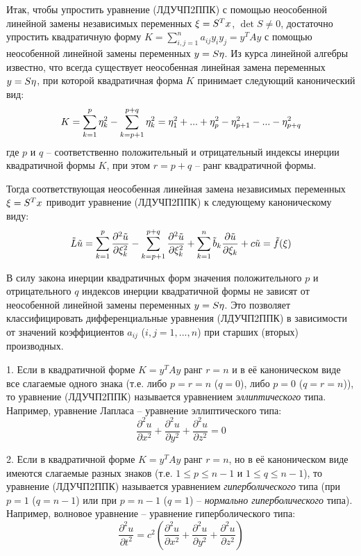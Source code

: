﻿
Итак, чтобы упростить уравнение (ЛДУЧП2ППК) с помощью неособенной линейной замены независимых переменных ${\rm \xi }=S^{T} x$, $\det S\ne 0$, достаточно упростить квадратичную форму $K=\sum _{i,j=1}^{n}a_{ij} y_{i} y_{j}  =y^{T} Ay$ с помощью неособенной линейной замены переменных $y=S{\rm \eta }$. Из курса линейной алгебры известно, что всегда существует неособенная линейная замена переменных $y=S{\rm \eta }$, при которой квадратичная форма $K$ принимает следующий канонический вид:
\[K=\sum _{k=1}^{p}{\rm \eta }_{k}^{2}  -\sum _{k=p+1}^{p+q}{\rm \eta }_{k}^{2}  ={\rm \eta }_{1}^{2} +...+{\rm \eta }_{p}^{2} -{\rm \eta }_{p+1}^{2} -...-{\rm \eta }_{p+q}^{2} \]
где $p$ и $q$ -- соответственно положительный и отрицательный индексы инерции квадратичной формы $K$, при этом $r=p+q$ -- ранг квадратичной формы.

Тогда соответствующая неособенная линейная замена независимых переменных ${\rm \xi }=S^{T} x$ приводит уравнение (ЛДУЧП2ППК) к следующему каноническому виду:
\[\tilde{L}\tilde{u}=\sum _{k=1}^{p}\frac{\partial ^{2} \tilde{u}}{\partial {\rm \xi }_{k}^{{\rm 2}} }  -\sum _{k=p+1}^{p+q}\frac{\partial ^{2} \tilde{u}}{\partial {\rm \xi }_{k}^{{\rm 2}} }  +\sum _{k=1}^{n}\tilde{b}_{k} \frac{\partial \tilde{u}}{\partial {\rm \xi }_{k} }  +c\tilde{u}=\tilde{f}({\rm \xi })\]

В силу закона инерции квадратичных форм значения положительного $p$ и отрицательного $q$ индексов инерции квадратичной формы не зависят от неособенной линейной замены переменных $y=S{\rm \eta }$. Это позволяет классифицировать дифференциальные уравнения (ЛДУЧП2ППК) в зависимости от значений коэффициентов $a_{ij} $ ($i,j=1,...,n$) при старших (вторых) производных.

1. Если в квадратичной форме $K=y^{T} Ay$ ранг $r=n$ и в её каноническом виде все слагаемые одного знака (т.е. либо $p=r=n$ ($q=0$), либо $p=0$ ($q=r=n$)), то уравнение (ЛДУЧП2ППК) называется уравнением \textit{эллиптического} типа. Например, уравнение Лапласа -- уравнение эллиптического типа:
\[\frac{\partial ^{2} u}{\partial x^{2} } +\frac{\partial ^{2} u}{\partial y^{2} } +\frac{\partial ^{2} u}{\partial z^{2} } =0\]

2. Если в квадратичной форме $K=y^{T} Ay$ ранг $r=n$, но в её каноническом виде имеются слагаемые разных знаков (т.е. $1\le p\le n-1$ и $1\le q\le n-1$), то уравнение (ЛДУЧП2ППК) называется уравнением \textit{гиперболического} типа (при $p=1$ ($q=n-1$) или при $p=n-1$ ($q=1$) -- \textit{нормально гиперболического} типа). Например, волновое уравнение -- уравнение гиперболического типа:
\[\frac{\partial ^{2} u}{\partial t^{2} } =c^{2} \left(\frac{\partial ^{2} u}{\partial x^{2} } +\frac{\partial ^{2} u}{\partial y^{2} } +\frac{\partial ^{2} u}{\partial z^{2} } \right)\]

